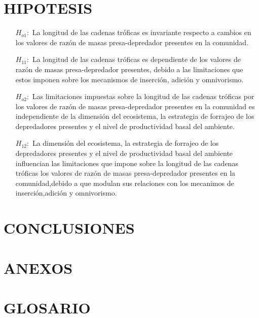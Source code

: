 \documentclass [12pt]{article}
\numberwithin{equation}{section}
\begin{document}
\section{HIPOTESIS}
\begin{itemize}
\item[$H_{o1}:$] La longitud de las cadenas tr\'oficas es invariante respecto a cambios en los valores de raz\'on de masas presa-depredador presentes en la comunidad.
\item[$H_{11}:$] La longitud de las cadenas tr\'oficas es dependiente de los valores de raz\'on de masas presa-depredador presentes, debido a las limitaciones que estos imponen sobre los mecanismos de inserci\'on, adici\'on y omnivorismo.

\item[$H_{o2}:$] Las limitaciones impuestas sobre la longitud de las cadenas tr\'oficas por los  valores de raz\'on de masas presa-depredador presentes en la comunidad es independiente de la dimensi\'on del ecosistema, la estrategia de forrajeo de los depredadores presentes y el nivel de productividad basal del ambiente.
\item[$H_{12}:$] La dimensi\'on del ecosistema, la estrategia de forrajeo de los depredadores presentes y el nivel de productividad basal del ambiente influencian las limitaciones que impone sobre la longitud de las cadenas tr\'oficas los valores de raz\'on de masas presa-depredador presentes en la comunidad,debido a que modulan sus relaciones con los mecanimos de inserci\'on,adici\'on y omnivorismo.

\end{itemize}








\section{CONCLUSIONES}




\newpage
\section{ANEXOS}


\section{GLOSARIO}

\newpage
\listoftodos[Notes]
\end{document}
